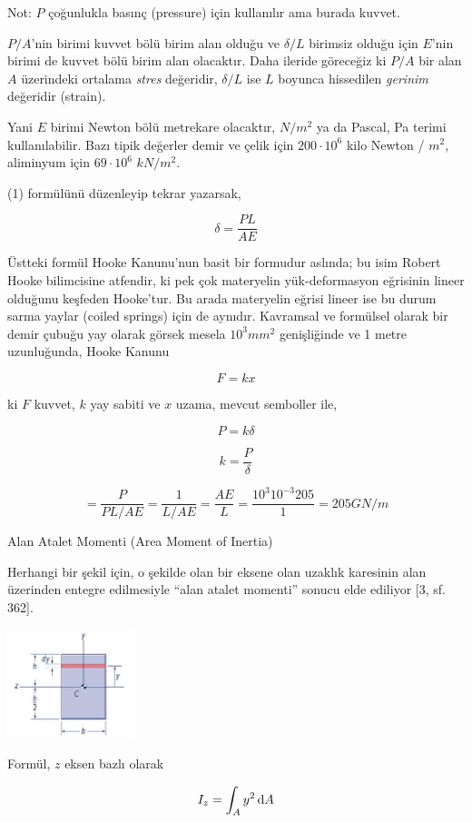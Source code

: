 \documentclass[12pt,fleqn]{article}\usepackage{../../common}
\begin{document}
Not: $P$ çoğunlukla basınç (pressure) için kullanılır ama burada kuvvet.

$P/A$'nin birimi kuvvet bölü birim alan olduğu ve $\delta / L$ birimsiz olduğu
için $E$'nin birimi de kuvvet bölü birim alan olacaktır. Daha ileride göreceğiz
ki $P/A$ bir alan $A$ üzerindeki ortalama {\em stres} değeridir, $\delta / L$
ise $L$ boyunca hissedilen {\em gerinim} değeridir (strain).

Yani $E$ birimi Newton bölü metrekare olacaktır, $N/m^2$ ya da Pascal, Pa terimi
kullanılabilir. Bazı tipik değerler demir ve çelik için $200\cdot 10^6$ kilo
Newton / $m^2$, aliminyum için $69 \cdot 10^6$ $kN / m^2$.

(1) formülünü düzenleyip tekrar yazarsak, 

$$
\delta = \frac{PL}{AE}
$$

Üstteki formül Hooke Kanunu'nun basit bir formudur aslında; bu isim Robert Hooke
bilimcisine atfendir, ki pek çok materyelin yük-deformasyon eğrisinin lineer
olduğunu keşfeden Hooke'tur. Bu arada materyelin eğrisi lineer ise bu durum
sarma yaylar (coiled springs) için de aynıdır. Kavramsal ve formülsel olarak
bir demir çubuğu yay olarak görsek mesela $10^3 mm^2$ genişliğinde ve
1 metre uzunluğunda, Hooke Kanunu

$$
F = k x
$$

ki $F$ kuvvet, $k$ yay sabiti ve $x$ uzama, mevcut semboller ile,

$$
P = k \delta
$$

$$
k = \frac{P}{\delta}
$$

$$
= \frac{P}{PL / AE} = \frac{1}{L / AE} = \frac{AE}{L} =
\frac{10^3 10^{-3} 205}{1} =
205 GN/m
$$

Alan Atalet Momenti (Area Moment of Inertia)

Herhangi bir şekil için, o şekilde olan bir eksene olan uzaklık karesinin alan
üzerinden entegre edilmesiyle ``alan atalet momenti'' sonucu elde ediliyor
[3, sf. 362]. 

\includegraphics[width=10em]{phy_020_strs_00_04.jpg}

Formül, $z$ eksen bazlı olarak

$$
I_z = \int_A y^2 \,\mathrm{d} A
$$
\end{document}
